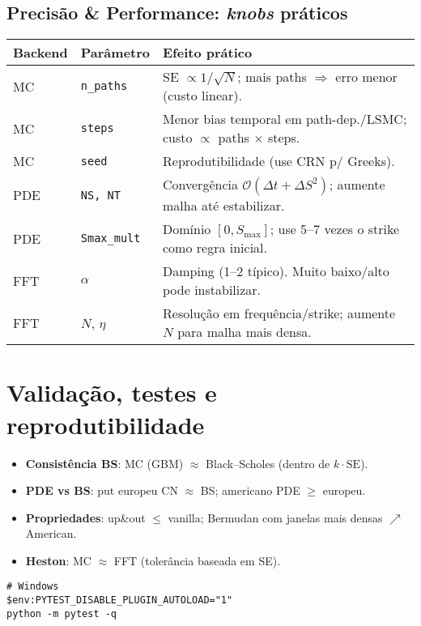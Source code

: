 \documentclass[11pt,a4paper]{article}
\begin{document}
\subsection{Precisão \& Performance: \emph{knobs} práticos}
\begin{center}
\begin{tabular}{@{}llp{7.5cm}@{}}
\toprule
Backend & Parâmetro & Efeito prático \\
\midrule
MC & \texttt{n\_paths} & SE $\propto 1/\sqrt{N}$; mais paths $\Rightarrow$ erro menor (custo linear). \\
MC & \texttt{steps} & Menor bias temporal em path-dep./LSMC; custo $\propto$ paths $\times$ steps. \\
MC & \texttt{seed} & Reprodutibilidade (use CRN p/ Greeks). \\
PDE & \texttt{NS, NT} & Convergência $\mathcal O(\Delta t + \Delta S^2)$; aumente malha até estabilizar. \\
PDE & \texttt{Smax\_mult} & Domínio $[0, S_{\max}]$; use 5–7 vezes o strike como regra inicial. \\
FFT & $\alpha$ & Damping (1–2 típico). Muito baixo/alto pode instabilizar. \\
FFT & $N$, $\eta$ & Resolução em frequência/strike; aumente $N$ para malha mais densa. \\
\bottomrule
\end{tabular}
\end{center}

\section{Validação, testes e reprodutibilidade}
\begin{itemize}[leftmargin=1.2em]
\item \textbf{Consistência BS}: MC (GBM) $\approx$ Black--Scholes (dentro de $k\cdot\mathrm{SE}$).
\item \textbf{PDE vs BS}: put europeu CN $\approx$ BS; americano PDE $\ge$ europeu.
\item \textbf{Propriedades}: up\&out $\le$ vanilla; Bermudan com janelas mais densas $\nearrow$ American.
\item \textbf{Heston}: MC $\approx$ FFT (tolerância baseada em SE).
\end{itemize}
\begin{verbatim}
# Windows
$env:PYTEST_DISABLE_PLUGIN_AUTOLOAD="1"
python -m pytest -q
\end{verbatim}
\end{document}
